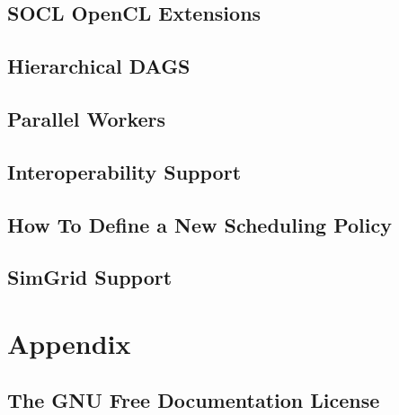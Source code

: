 \chapter{SOCL OpenCL Extensions}
\label{SOCLOpenclExtensions}
\hypertarget{SOCLOpenclExtensions}{}


\chapter{Hierarchical DAGS}
\label{HierarchicalDAGS}
\hypertarget{HierarchicalDAGS}{}


\chapter{Parallel Workers}
\label{ParallelWorker}
\hypertarget{ParallelWorker}{}


\chapter{Interoperability Support}
\label{InteropSupport}
\hypertarget{InteropSupport}{}


\chapter{How To Define a New Scheduling Policy}
\label{HowToDefineANewSchedulingPolicy}
\hypertarget{HowToDefineANewSchedulingPolicy}{}


\chapter{SimGrid Support}
\label{SimGridSupport}
\hypertarget{SimGridSupport}{}


\part{Appendix}

\chapter{The GNU Free Documentation License}
\label{GNUFreeDocumentationLicense}
\hypertarget{GNUFreeDocumentationLicense}{}




